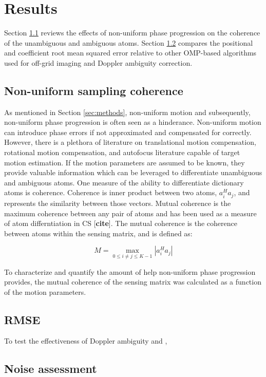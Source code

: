 
\section{Results}
\label{sec:results}

Section \ref{sec:coherence} reviews the effects of non-uniform phase progression on the coherence of the unambiguous and ambiguous atoms. Section \ref{sec:rmse} compares the positional and coefficient root mean squared error relative to other OMP-based algorithms used for off-grid imaging and Doppler ambiguity correction.

\subsection{Non-uniform sampling coherence}
\label{sec:coherence}

As mentioned in Section \ref{sec:methods}, non-uniform motion and subsequently, non-uniform phase progression is often seen as a hinderance. Non-uniform motion can introduce phase errors if not approximated and compensated for correctly. However, there is a plethora of literature on translational motion compensation, rotational motion compensation, and autofocus literature capable of target motion estimation. If the motion parameters are assumed to be known, they provide valuable information which can be leveraged to differentiate unambiguous and ambiguous atoms. One measure of the ability to differentiate dictionary atoms is coherence. Coherence is inner product between two atoms, $a_{i}^{H}a_{j}$, and represents the similarity between those vectors. Mutual coherence is the maximum coherence between any pair of atoms and has been used as a measure of atom differntiation in CS [\textbf{cite}]. The mutual coherence is the coherence between atoms within the sensing matrix, and is defined as:

\begin{equation}
    M = \max_{0 \leq i \neq j \leq K-1} |a^{H}_{i}a_{j}|
\end{equation}

To characterize and quantify the amount of help non-uniform phase progression provides, the mutual coherence of the sensing matrix was calculated as a function of the motion parameters.

\subsection{RMSE}
\label{sec:rmse}

To test the effectiveness of Doppler ambiguity and , 

\subsection{Noise assessment}
\label{sec:noise}
